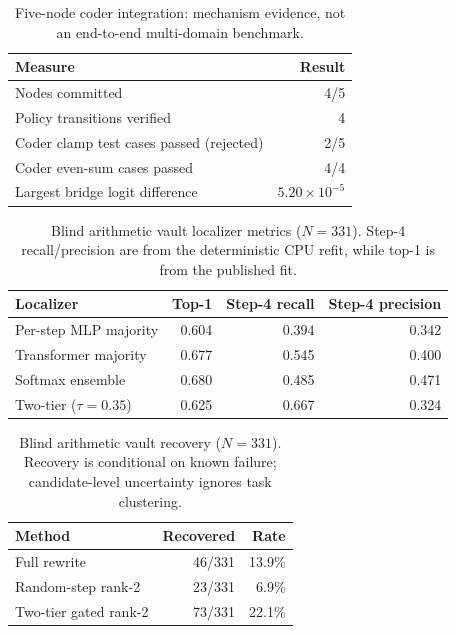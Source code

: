 \begin{table}[ht]
\centering
\caption{Five-node coder integration: mechanism evidence, not an end-to-end multi-domain benchmark.}
\label{tab:dag-integration}
\begin{tabular}{lr}
\toprule
Measure & Result \\
\midrule
Nodes committed & 4/5 \\
Policy transitions verified & 4 \\
Coder clamp test cases passed (rejected) & 2/5 \\
Coder even-sum cases passed & 4/4 \\
Largest bridge logit difference & $5.20\times 10^{-5}$ \\
\bottomrule
\end{tabular}
\end{table}

\begin{table}[ht]
\centering
\caption{Blind arithmetic vault localizer metrics ($N=331$). Step-4 recall/precision are from the deterministic CPU refit, while top-1 is from the published fit.}
\label{tab:localizer}
\begin{tabular}{lrrr}
\toprule
Localizer & Top-1 & Step-4 recall & Step-4 precision \\
\midrule
Per-step MLP majority & 0.604 & 0.394 & 0.342 \\
Transformer majority & 0.677 & 0.545 & 0.400 \\
Softmax ensemble & 0.680 & 0.485 & 0.471 \\
Two-tier ($\tau=0.35$) & 0.625 & 0.667 & 0.324 \\
\bottomrule
\end{tabular}
\end{table}

\begin{table}[ht]
\centering
\caption{Blind arithmetic vault recovery ($N=331$). Recovery is conditional on known failure; candidate-level uncertainty ignores task clustering.}
\label{tab:vault-recovery}
\begin{tabular}{lrr}
\toprule
Method & Recovered & Rate \\
\midrule
Full rewrite & 46/331 & 13.9\% \\
Random-step rank-2 & 23/331 & 6.9\% \\
Two-tier gated rank-2 & 73/331 & 22.1\% \\
\bottomrule
\end{tabular}
\end{table}

